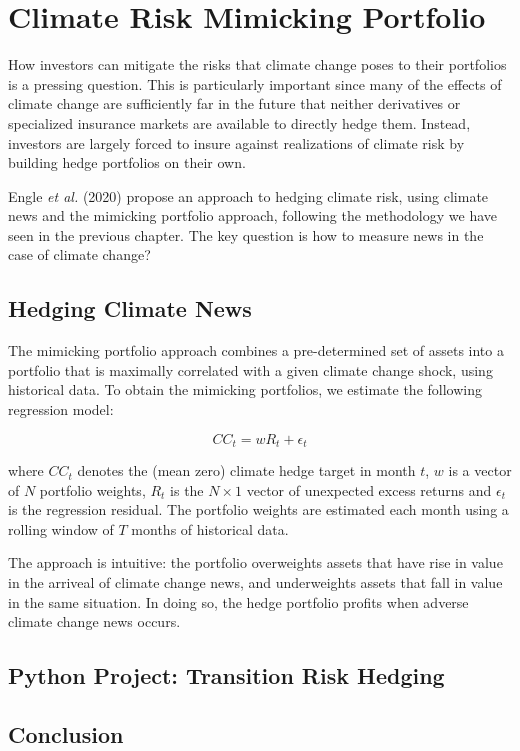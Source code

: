 \chapter{Climate Risk Mimicking Portfolio}

How investors can mitigate the risks that climate 
change poses to their portfolios is a pressing question.
This is particularly important since many 
of the effects of climate change are sufficiently far 
in the future that neither derivatives or specialized 
insurance markets are available to directly hedge them. 
Instead, investors are largely forced to insure against 
realizations of climate risk by building hedge 
portfolios on their own.

Engle \textit{et al.} (2020) propose an approach 
to hedging climate risk, using climate news and the mimicking portfolio
approach, following 
the methodology we have seen in the previous chapter. 
The key question is how to measure news in the case of climate
change? 

\section{Hedging Climate News}

The mimicking portfolio approach combines a pre-determined set of 
assets into a portfolio that is maximally correlated with a given 
climate change shock, using historical data. To obtain the mimicking
portfolios, we estimate the following regression model:

\begin{equation}
    \label{eq:regression}
    CC_t = w R_t + \epsilon_t
\end{equation}

where $CC_t$ denotes the (mean zero) climate hedge target in month $t$,
$w$ is a vector of $N$ portfolio weights, $R_t$ is the $N \times 1$ vector 
of unexpected excess returns and $\epsilon_t$ is the regression residual.
The portfolio weights are estimated each month using a rolling window of
$T$ months of historical data. 

The approach is intuitive: the portfolio overweights assets that have
rise in value in the arriveal of climate change news, and underweights
assets that fall in value in the same situation. 
In doing so, the hedge portfolio profits when adverse climate 
change news occurs.


\section{Python Project: Transition Risk Hedging}

\section{Conclusion}